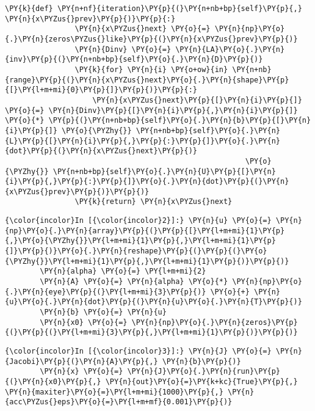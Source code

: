 \begin{Verbatim}[commandchars=\\\{\}]
            \PY{k}{def} \PY{n+nf}{iteration}\PY{p}{(}\PY{n+nb+bp}{self}\PY{p}{,} \PY{n}{x\PYZus{}prev}\PY{p}{)}\PY{p}{:}
                \PY{n}{x\PYZus{}next} \PY{o}{=} \PY{n}{np}\PY{o}{.}\PY{n}{zeros\PYZus{}like}\PY{p}{(}\PY{n}{x\PYZus{}prev}\PY{p}{)}
                \PY{n}{Dinv} \PY{o}{=} \PY{n}{LA}\PY{o}{.}\PY{n}{inv}\PY{p}{(}\PY{n+nb+bp}{self}\PY{o}{.}\PY{n}{D}\PY{p}{)}
                \PY{k}{for} \PY{n}{i} \PY{o+ow}{in} \PY{n+nb}{range}\PY{p}{(}\PY{n}{x\PYZus{}next}\PY{o}{.}\PY{n}{shape}\PY{p}{[}\PY{l+m+mi}{0}\PY{p}{]}\PY{p}{)}\PY{p}{:}
                    \PY{n}{x\PYZus{}next}\PY{p}{[}\PY{n}{i}\PY{p}{]} \PY{o}{=} \PY{n}{Dinv}\PY{p}{[}\PY{n}{i}\PY{p}{,}\PY{n}{i}\PY{p}{]} \PY{o}{*} \PY{p}{(}\PY{n+nb+bp}{self}\PY{o}{.}\PY{n}{b}\PY{p}{[}\PY{n}{i}\PY{p}{]} \PY{o}{\PYZhy{}} \PY{n+nb+bp}{self}\PY{o}{.}\PY{n}{L}\PY{p}{[}\PY{n}{i}\PY{p}{,}\PY{p}{:}\PY{p}{]}\PY{o}{.}\PY{n}{dot}\PY{p}{(}\PY{n}{x\PYZus{}next}\PY{p}{)} 
                                                       \PY{o}{\PYZhy{}} \PY{n+nb+bp}{self}\PY{o}{.}\PY{n}{U}\PY{p}{[}\PY{n}{i}\PY{p}{,}\PY{p}{:}\PY{p}{]}\PY{o}{.}\PY{n}{dot}\PY{p}{(}\PY{n}{x\PYZus{}prev}\PY{p}{)}\PY{p}{)}
                \PY{k}{return} \PY{n}{x\PYZus{}next}
\end{Verbatim}

    \begin{Verbatim}[commandchars=\\\{\}]
{\color{incolor}In [{\color{incolor}2}]:} \PY{n}{u} \PY{o}{=} \PY{n}{np}\PY{o}{.}\PY{n}{array}\PY{p}{(}\PY{p}{[}\PY{l+m+mi}{1}\PY{p}{,}\PY{o}{\PYZhy{}}\PY{l+m+mi}{1}\PY{p}{,}\PY{l+m+mi}{1}\PY{p}{]}\PY{p}{)}\PY{o}{.}\PY{n}{reshape}\PY{p}{(}\PY{p}{(}\PY{o}{\PYZhy{}}\PY{l+m+mi}{1}\PY{p}{,}\PY{l+m+mi}{1}\PY{p}{)}\PY{p}{)}
        \PY{n}{alpha} \PY{o}{=} \PY{l+m+mi}{2}
        \PY{n}{A} \PY{o}{=} \PY{n}{alpha} \PY{o}{*} \PY{n}{np}\PY{o}{.}\PY{n}{eye}\PY{p}{(}\PY{l+m+mi}{3}\PY{p}{)} \PY{o}{+} \PY{n}{u}\PY{o}{.}\PY{n}{dot}\PY{p}{(}\PY{n}{u}\PY{o}{.}\PY{n}{T}\PY{p}{)}
        \PY{n}{b} \PY{o}{=} \PY{n}{u}
        \PY{n}{x0} \PY{o}{=} \PY{n}{np}\PY{o}{.}\PY{n}{zeros}\PY{p}{(}\PY{p}{(}\PY{l+m+mi}{3}\PY{p}{,}\PY{l+m+mi}{1}\PY{p}{)}\PY{p}{)}
\end{Verbatim}

    \begin{Verbatim}[commandchars=\\\{\}]
{\color{incolor}In [{\color{incolor}3}]:} \PY{n}{J} \PY{o}{=} \PY{n}{Jacobi}\PY{p}{(}\PY{n}{A}\PY{p}{,} \PY{n}{b}\PY{p}{)}
        \PY{n}{x} \PY{o}{=} \PY{n}{J}\PY{o}{.}\PY{n}{run}\PY{p}{(}\PY{n}{x0}\PY{p}{,} \PY{n}{out}\PY{o}{=}\PY{k+kc}{True}\PY{p}{,} \PY{n}{maxiter}\PY{o}{=}\PY{l+m+mi}{1000}\PY{p}{,} \PY{n}{acc\PYZus{}eps}\PY{o}{=}\PY{l+m+mf}{0.001}\PY{p}{)}
\end{Verbatim}

